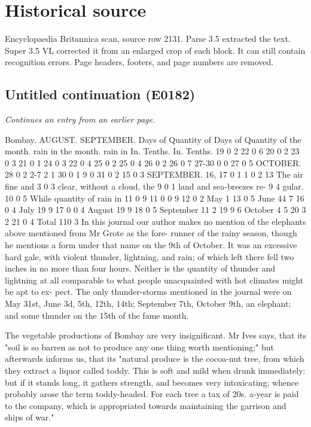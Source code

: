 \documentclass{article}
\begin{document}
\section*{Historical source}
Encyclopaedia Britannica scan, source row 2131. Parse 3.5 extracted the text. Super 3.5 VL corrected it from an enlarged crop of each block. It can still contain recognition errors.
Page headers, footers, and page numbers are removed.

\subsection*{Untitled continuation (E0182)}
\textit{Continues an entry from an earlier page.}

Bombay. AUGUST. SEPTEMBER.
Days of Quantity of Days of Quantity of
the month. rain in the month. rain in
In. Tenths. In. Tenths.
19 0 2 22 0 6
20 0 2 23 0 3
21 0 1 24 0 3
22 0 4 25 0 2
25 0 4 26 0 2
26 0 7 27-30 0 0
27 0 5 OCTOBER.
28 0 2 2-7 2 1
30 0 1 9 0
31 0 2 15 0 3
SEPTEMBER. 16, 17 0 1
1 0 2 13 The air fine and
3 0 3
clear, without a cloud, the
9 0 1
land and sea-breezes re-
9 4 gular.
10 0 5 While quantity of rain in
11 0 9
11 0 0 9
12 0 2 May 1
13 0 5 June 44 7
16 0 4 July 19 9
17 0 0 4 August 19 9
18 0 5 September 11 2
19 9 6 October 4 5
20 3 2
21 0 4 Total 110 3
In this journal our author makes no mention of the
elephants above mentioned from Mr Grote as the fore-
runner of the rainy season, though he mentions a form
under that name on the 9th of October. It was an
excessive hard gale, with violent thunder, lightning,
and rain; of which left there fell two inches in no
more than four hours. Neither is the quantity of
thunder and lightning at all comparable to what people
unacquainted with hot climates might be apt to ex-
pect. The only thunder-storms mentioned in the
journal were on May 31st, June 3d, 5th, 12th, 14th;
September 7th, October 9th, an elephant; and some
thunder on the 15th of the fame month.

The vegetable productions of Bombay are very insignificant. Mr Ives says, that its "soil is so barren as not to produce any one thing worth mentioning;" but afterwards informs us, that its "natural produce is the cocoa-nut tree, from which they extract a liquor called toddy. This is soft and mild when drunk immediately: but if it stands long, it gathers strength, and becomes very intoxicating; whence probably arose the term toddy-headed. For each tree a tax of 20s. a-year is paid to the company, which is appropriated towards maintaining the garrison and ships of war."
\end{document}
